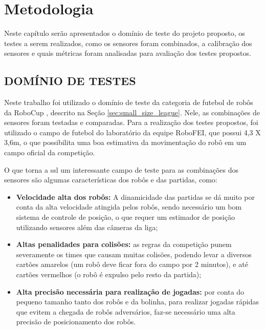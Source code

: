 \documentclass[acronym, symbols, table]{fei}
\begin{document}
\chapter{Metodologia}\label{sec:metodologia}

	Neste capítulo serão apresentados o domínio de teste do projeto proposto, os testes a serem realizados, como os sensores foram combinados, a calibração dos sensores e quais métricas foram analisadas para avaliação dos testes propostos.
	
	\section{DOMÍNIO DE TESTES} \label{sec:dominio_de_testes}
	
		Neste trabalho foi utilizado o domínio de teste da categoria  de futebol de robôs da RoboCup \cite{RoboCup}, descrito na Seção \ref{sec:small_size_league}. Nele, as combinações de sensores foram testadas e comparadas. Para a realização dos testes propostos, foi utilizado o campo de futebol do laboratório da equipe RoboFEI, que possui 4,3 X 3,6m, o que possibilita uma boa estimativa da movimentação do robô em um campo oficial da competição.
		
		O que torna a \acrshort{ssl} um interessante campo de teste para as combinações dos sensores são algumas características dos robôs e das partidas, como:
		
		\begin{itemize}
			\item \textbf{Velocidade alta dos robôs:} A dinamicidade das partidas se dá muito por conta da alta velocidade atingida pelos robôs, sendo necessário um bom sistema de controle de posição, o que requer um estimador de posição utilizando sensores além das câmeras da liga;
			
			\item \textbf{Altas penalidades para colisões:} as regras da competição punem severamente os times que causam muitas colisões, podendo levar a diversos cartões amarelos (um robô deve ficar fora do campo por 2 minutos), e até cartões vermelhos (o robô é expulso pelo resto da partida);
			
			\item \textbf{Alta precisão necessária para realização de jogadas:} por conta do pequeno tamanho tanto dos robôs e da bolinha, para realizar jogadas rápidas que evitem a chegada de robôs adversários, faz-se necessário uma alta precisão de posicionamento dos robôs.
		\end{itemize}
		
\end{document}
